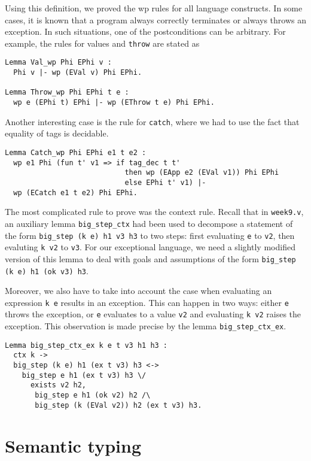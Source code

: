 \documentclass{article}
\begin{document}
Using this definition, we proved the wp rules for all language constructs. In some cases, it is known that a program always correctly terminates or
always throws an exception. In such situations, one of the postconditions can be arbitrary. For example, the rules for values and \texttt{throw} are stated as
\begin{lstlisting}
Lemma Val_wp Phi EPhi v :
  Phi v |- wp (EVal v) Phi EPhi.

Lemma Throw_wp Phi EPhi t e :
  wp e (EPhi t) EPhi |- wp (EThrow t e) Phi EPhi.
\end{lstlisting}
Another interesting case is the rule for \texttt{catch}, where we had to use the fact that equality of tags is decidable.
\begin{lstlisting}
Lemma Catch_wp Phi EPhi e1 t e2 :
  wp e1 Phi (fun t' v1 => if tag_dec t t'
                            then wp (EApp e2 (EVal v1)) Phi EPhi
                            else EPhi t' v1) |-
  wp (ECatch e1 t e2) Phi EPhi.
\end{lstlisting}

The most complicated rule to prove was the context rule. Recall that in \texttt{week9.v}, an auxiliary lemma \texttt{big\_step\_ctx} had been used to
decompose a statement of the form \texttt{big\_step (k e) h1 v3 h3} to two steps: first evaluating \texttt{e} to \texttt{v2}, then evaluting \texttt{k v2} to
\texttt{v3}. For our exceptional language, we need a slightly modified version of this lemma to deal with goals and assumptions of the form
\texttt{big\_step (k e) h1 (ok v3) h3}. 

Moreover, we also have to take into account the case when evaluating an expression \texttt{k e} results in an exception. This can happen in two ways:
either \texttt{e} throws the exception, or \texttt{e} evaluates to a value \texttt{v2} and evaluating \texttt{k v2} raises the exception. This observation is made
precise by the lemma \texttt{big\_step\_ctx\_ex}.
\begin{lstlisting}
Lemma big_step_ctx_ex k e t v3 h1 h3 :
  ctx k ->
  big_step (k e) h1 (ex t v3) h3 <->
    big_step e h1 (ex t v3) h3 \/
      exists v2 h2,
       big_step e h1 (ok v2) h2 /\
       big_step (k (EVal v2)) h2 (ex t v3) h3.
\end{lstlisting}

\section{Semantic typing}
\end{document}

